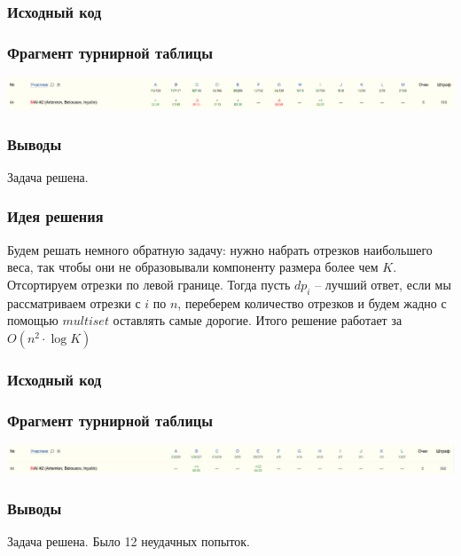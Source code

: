 \subsubsection*{Исходный код}

\subsubsection*{Фрагмент турнирной таблицы}
\includegraphics[width=\textwidth]{images/220201.png}\newline\noindent
\subsubsection*{Выводы}
Задача решена.
\pagebreak


\subsubsection*{Идея решения}
Будем решать немного обратную задачу: нужно набрать отрезков наибольшего веса, так чтобы они не образовывали компоненту размера более чем $K$. Отсортируем отрезки по левой границе. Тогда пусть $dp_{i}$ -- лучший ответ, если мы рассматриваем отрезки с $i$ по $n$, переберем количество отрезков и будем жадно с помощью $multiset$ оставлять самые дорогие. Итого решение работает за $O(n^2 \cdot \log{K})$
\subsubsection*{Исходный код}

\subsubsection*{Фрагмент турнирной таблицы}
\includegraphics[width=\textwidth]{images/220202.png}\newline\noindent
\subsubsection*{Выводы}
Задача решена. Было 12 неудачных попыток.
\pagebreak


